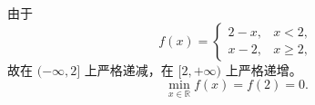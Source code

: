 由于
\[
f(x)=\begin{cases}2-x,&x<2,\\ x-2,&x\ge2,\end{cases}
\]
故在 $(-\infty,2]$ 上严格递减，在 $[2,+\infty)$ 上严格递增。
\[
\boxed{\min_{x\in\mathbb R}f(x)=f(2)=0.}
\]
